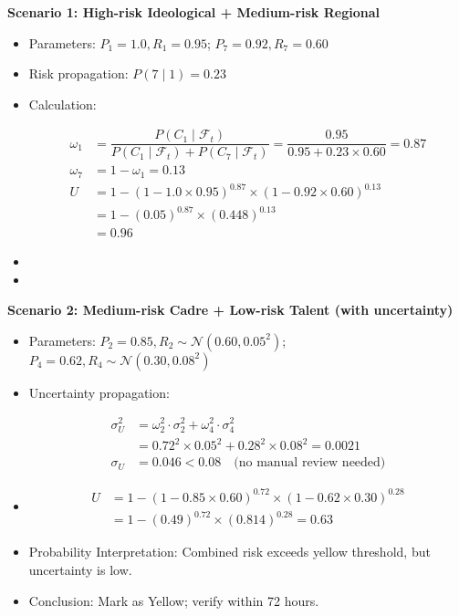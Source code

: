 \documentclass{article}
\numberwithin{equation}{section}
\begin{document}
\textbf{Scenario 1: High-risk Ideological + Medium-risk Regional}
\begin{itemize}
    \item Parameters: $ P_1 = 1.0, R_1 = 0.95 $; $ P_7 = 0.92, R_7 = 0.60 $
    \item Risk propagation: $ P(7 \mid 1) = 0.23 $
    \item Calculation:

    \begin{align*}
    \omega_1 &= \dfrac{P(C_1 \mid \mathcal{F}_t)}{P(C_1 \mid \mathcal{F}_t) + P(C_7 \mid \mathcal{F}_t)} = \dfrac{0.95}{0.95 + 0.23 \times 0.60} = 0.87 \\
    \omega_7 &= 1 - \omega_1 = 0.13 \\
    U &= 1 - (1 - 1.0 \times 0.95)^{0.87} \times (1 - 0.92 \times 0.60)^{0.13} \\
    &= 1 - (0.05)^{0.87} \times (0.448)^{0.13} \\
    &= 0.96
    \end{align*}
    
    \item {}
    \item {}
\end{itemize}

\textbf{Scenario 2: Medium-risk Cadre + Low-risk Talent (with uncertainty)}
\begin{itemize}
    \item Parameters: $ P_2 = 0.85, R_2 \sim \mathcal{N}(0.60, 0.05^2) $; $ P_4 = 0.62, R_4 \sim \mathcal{N}(0.30, 0.08^2) $
    \item Uncertainty propagation:
    
    \begin{align*}
    \sigma_U^2 &= \omega_2^2 \cdot \sigma_2^2 + \omega_4^2 \cdot \sigma_4^2 \\
    &= 0.72^2 \times 0.05^2 + 0.28^2 \times 0.08^2 = 0.0021 \\
    \sigma_U &= 0.046 < 0.08 \quad \text{(no manual review needed)}
    \end{align*}

    \item {}

    \begin{align*}
    U &= 1 - (1 - 0.85 \times 0.60)^{0.72} \times (1 - 0.62 \times 0.30)^{0.28} \\
    &= 1 - (0.49)^{0.72} \times (0.814)^{0.28} = 0.63
    \end{align*}
    
    \item Probability Interpretation: Combined risk exceeds yellow threshold, but uncertainty is low.
    \item Conclusion: Mark as Yellow; verify within 72 hours.
\end{itemize}
\end{document}
